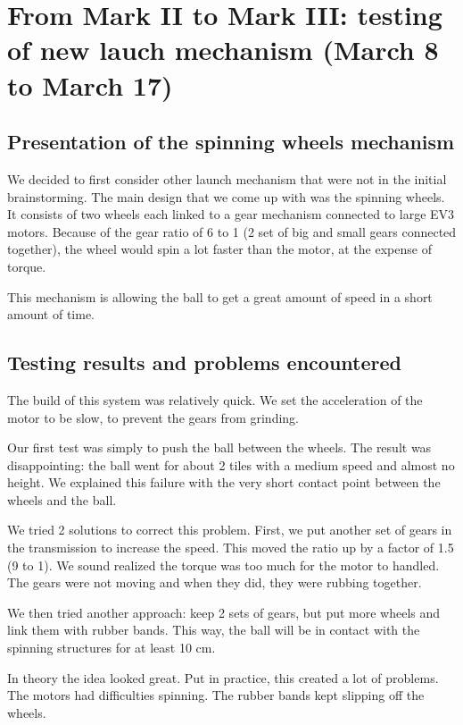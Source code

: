 \documentclass[]{article}
\begin{document}
\newpage

\section{From Mark II to Mark III: testing of new lauch mechanism (March 8 to March 17)}
\subsection{Presentation of the spinning wheels mechanism}
We decided to first consider other launch mechanism that were not in the initial brainstorming.  The main design that we come up with was the spinning wheels.  It consists of two wheels each linked to a gear mechanism connected to large EV3 motors.  Because of the gear ratio of 6 to 1 (2 set of big and small gears connected together), the wheel would spin a lot faster than the motor, at the expense of torque.  

This mechanism is allowing the ball to get a great amount of speed in a short amount of time.    

\subsection{Testing results and problems encountered}
The build of this system was relatively quick.  We set the acceleration of the motor to be slow, to prevent the gears from grinding.

Our first test was simply to push the ball between the wheels.  The result was disappointing: the ball went for about 2 tiles with a medium speed and almost no height.  We explained this failure with the very short contact point between the wheels and the ball.  

We tried 2 solutions to correct this problem.  First, we put another set of gears in the transmission to increase the speed.  This moved the ratio up by a factor of 1.5 (9 to 1).  We sound realized the torque was too much for the motor to handled.  The gears were not moving and when they did, they were rubbing together.


We then tried another approach: keep 2 sets of gears, but put more wheels and link them with rubber bands.  This way, the ball will be in contact with the spinning structures for at least 10 cm. 

In theory the idea looked great.  Put in practice, this created a lot of problems.  The motors had difficulties spinning.  The rubber bands kept slipping off the wheels. 
\end{document}
